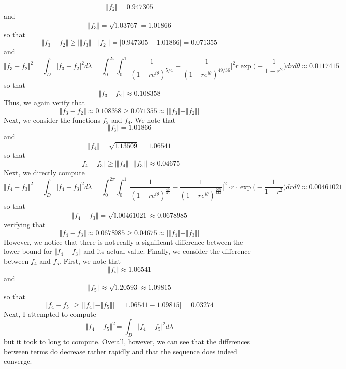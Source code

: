 \documentclass[12pt]{article}
\begin{document}
\[
\Vert f_2 \Vert = 0.947305
\] and
\[
\Vert f_3 \Vert = \sqrt{1.03767} = 1.01866 
\] so that
\[
\Vert f_3 - f_2 \Vert \geq \vert \Vert f_3 \Vert - \Vert f_2 \Vert \vert = \vert 0.947305 - 1.01866 \vert = 0.071355
\] and 
\[
\Vert f_3 - f_2 \Vert^2 = \int_D \vert f_3 - f_2 \vert^2 d\lambda = \int_0^{2\pi} \int_0^1 \bigg\vert \frac{1}{(1-re^{i\theta})^{5/4}} - \frac{1}{(1-re^{i\theta})^{49/36}} \bigg\vert^2 r \exp\bigg(-\frac{1}{1-r^2}\bigg) dr d\theta \approx 0.0117415
\] so that
\[
\Vert f_3 - f_2 \Vert \approx 0.108358
\] Thus, we again verify that
\[
\Vert f_3 - f_2 \Vert \approx 0.108358 \geq 0.071355 \approx  \vert \Vert f_3 \Vert - \Vert f_2 \Vert \vert
\] Next, we consider the functions $f_3$ and $f_4$. We note that
\[
\Vert f_3 \Vert = 1.01866
\] and
\[
\Vert f_4 \Vert = \sqrt{1.13509} = 1.06541
\] so that
\[
\Vert f_4 - f_3 \Vert \geq \vert \Vert f_4 \Vert - \Vert f_3 \Vert \vert \approx 0.04675
\]
Next, we directly compute
\[
\Vert f_4 - f_3 \Vert^2 = \int_D \vert f_4 - f_3 \vert^2 d\lambda = \int_0^{2\pi} \int_0^1 \bigg \vert \frac{1}{(1-re^{i\theta})^{\frac{49}{36}}} - \frac{1}{(1-re^{i\theta})^{\frac{205}{144}}} \bigg \vert^2 \cdot r \cdot \exp\bigg(-\frac{1}{1-r^2}\bigg) dr d\theta \approx 0.00461021
\] so that
\[
\Vert f_4 - f_3 \Vert = \sqrt{0.00461021} \approx 0.0678985
\] verifying that
\[
\Vert f_4 - f_3 \Vert \approx 0.0678985 \geq 0.04675 \approx \vert \Vert f_4 \Vert - \Vert f_3 \Vert \vert
\] However, we notice that there is not really a significant difference between the lower bound for $\Vert f_4 - f_3 \Vert$ and its actual value. Finally, we consider the difference between $f_4$ and $f_5$. First, we note that
\[
\Vert f_4 \Vert \approx 1.06541
\] and
\[
\Vert f_5 \Vert \approx \sqrt{1.20593} \approx 1.09815
\] so that
\[
\Vert f_4 - f_5 \Vert \geq \vert \Vert f_4 \Vert - \Vert f_5 \Vert \vert = \vert 1.06541 - 1.09815 \vert = 0.03274
\] Next, I attempted to compute
\[
\Vert f_4 - f_5 \Vert^2 = \int_D \vert f_4 - f_5 \vert^2 d\lambda
\] but it took to long to compute. Overall, however, we can see that the differences between terms do decrease rather rapidly and that the sequence does indeed converge.
\end{document}
